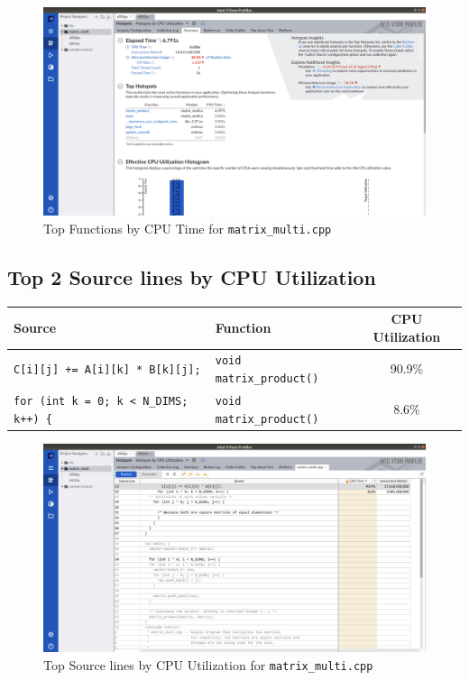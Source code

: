 \documentclass[11pt, swedish, openany]{book}
\begin{document}
\begin{figure}[H]
    \centering
    \includegraphics[scale=0.25]{vtune/matrix_multi/hs.png}
    \caption{Top Functions by CPU Time for \texttt{matrix\_multi.cpp}}
\end{figure}

\newpage
\subsection*{Top 2 Source lines by CPU Utilization}
\begin{table}[H]
    \begin{tabular}{||l|l||c||}
        \hline
        Source                                        & Function                        & CPU Utilization \\
        \hline
        \texttt{C[i][j] += A[i][k] * B[k][j];}        & \texttt{void matrix\_product()} & 90.9\%          \\
        \texttt{for (int k = 0; k < N\_DIMS; k++) \{} & \texttt{void matrix\_product()} & 8.6\%           \\
        \hline
    \end{tabular}
\end{table}

\begin{figure}[H]
    \centering
    \includegraphics[scale=0.25]{vtune/matrix_multi/sc.png}
    \caption{Top Source lines by CPU Utilization for \texttt{matrix\_multi.cpp}}
\end{figure}
\end{document}
